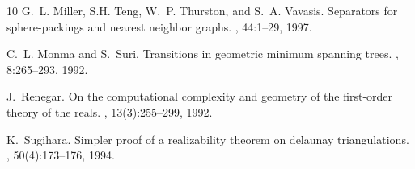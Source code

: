 \documentclass[11pt]{article}
\begin{document}
\begin{thebibliography}{10}
G.~L. Miller, S.H. Teng, W.~P. Thurston, and S.~A. Vavasis.
\newblock Separators for sphere-packings and nearest neighbor graphs.
, 44:1--29, 1997.

C.~L. Monma and S.~Suri.
\newblock Transitions in geometric minimum spanning trees.
, 8:265--293, 1992.

J.~Renegar.
\newblock On the computational complexity and geometry of the first-order theory of the reals.
, 13(3):255--299, 1992.

K.~Sugihara.
\newblock Simpler proof of a realizability theorem on delaunay triangulations.
, 50(4):173--176, 1994.

\end{thebibliography}
\end{document}
